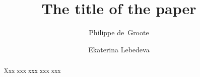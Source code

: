 \documentclass[a4paper]{article}
\title{The title of the paper}
\author{Philippe de~Groote
\and
Ekaterina Lebedeva}
\date{}
\begin{document}
\maketitle

\begin{abstract}
Xxx xxx xxx xxx xxx
\end{abstract}













\end{document}
